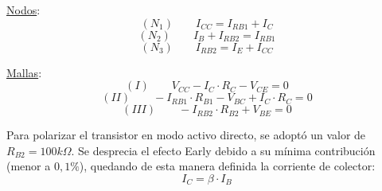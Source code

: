 \documentclass[10pt]{article}
\begin{document}
\setlength{\columnsep}{0.2cm} 
\begin{multicols}{2}

    \underline{Nodos}:
    \begin{equation*}
        (N_1)\qquad I_{CC} = I_{RB1} + I_C
    \end{equation*}
    \begin{equation*}
        (N_2)\qquad I_{B} + I_{RB2} = I_{RB1}
    \end{equation*}
    \begin{equation*}
        (N_3)\qquad I_{RB2} = I_E + I_{CC}
    \end{equation*}
    
    \columnbreak

    \underline{Mallas}:
    \begin{equation*}
       (I)\qquad V_{CC} - I_C\cdot R_C - V_{CE} = 0
    \end{equation*}
    \begin{equation*}
       (II)\qquad -I_{RB1}\cdot R_{B1} - V_{BC} +I_C\cdot R_C = 0
    \end{equation*}
    \begin{equation*}
       (III)\qquad -I_{RB2}\cdot R_{B2} + V_{BE} = 0
    \end{equation*}
    
\end{multicols}

Para polarizar el transistor en modo activo directo, se adoptó un valor de $R_{B2} = 100k \Omega$. Se desprecia el efecto Early debido a su mínima contribución (menor a $0,1\%$), quedando de esta manera definida la corriente de colector:
\begin{equation}
    I_C = \beta \cdot I_B 
    \label{ref: ecuacionCorrienteColector}
\end{equation}
\end{document}
